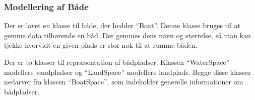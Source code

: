 \subsubsection{Modellering af Både}
\label{sub:bade}

Der er lavet en klasse til både, der hedder \enquote{Boat}. Denne klasse bruges til at gemme data tilhørende en båd. Der gemmes dens navn og størrelse, så man kan tjekke hvorvidt en given plads er stor nok til at rumme båden.

Der er to klasser til repræsentation af bådpladser. Klassen \enquote{WaterSpace} modellere vandpladser og \enquote{LandSpace} modellere landplads. Begge disse klasser nedarver fra klassen \enquote{BoatSpace}, som indeholder generelle informationer om bådpladser.

